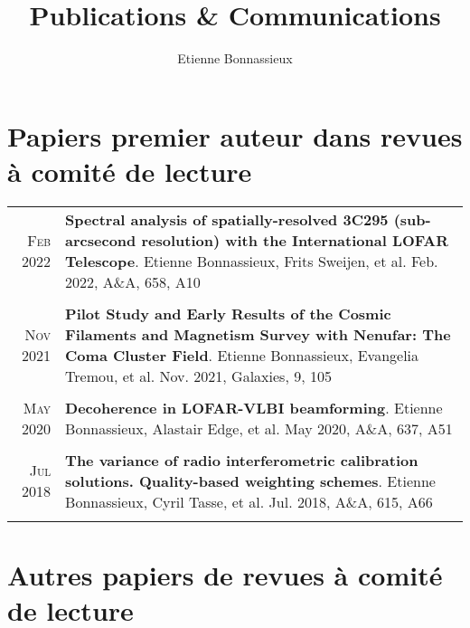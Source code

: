 \documentclass[11pt,a4paper,notitlepage]{article}
\author{Etienne Bonnassieux}
\title{Publications \& Communications}
\date{}
\begin{document}
\maketitle

\section{Papiers premier auteur dans revues \`a comit\'e de lecture}

\begin{tabular}{r|p{16.5cm}}
	
\textsc{Feb 2022} & \textbf{Spectral analysis of spatially-resolved 3C295 (sub-arcsecond resolution) with the International LOFAR Telescope}. Etienne Bonnassieux, Frits Sweijen, et al. Feb. 2022, A\&A, 658, A10\\
\multicolumn{2}{c}{} \\


\textsc{Nov 2021} & \textbf{Pilot Study and Early Results of the Cosmic Filaments and Magnetism Survey with Nenufar: The Coma Cluster Field}. Etienne Bonnassieux, Evangelia Tremou, et al. Nov. 2021, Galaxies, 9, 105\\
\multicolumn{2}{c}{} \\

\textsc{May 2020} & \textbf{Decoherence in LOFAR-VLBI beamforming}. Etienne Bonnassieux, Alastair Edge, et al. May 2020, A\&A, 637, A51\\
\multicolumn{2}{c}{} \\

\textsc{Jul 2018} & \textbf{The variance of radio interferometric calibration solutions. Quality-based weighting schemes}. Etienne Bonnassieux, Cyril Tasse, et al. Jul. 2018, A\&A, 615, A66\\
\multicolumn{2}{c}{} \\
	
\end{tabular}


\section{Autres papiers de revues \`a comit\'e de lecture}
\end{document}
